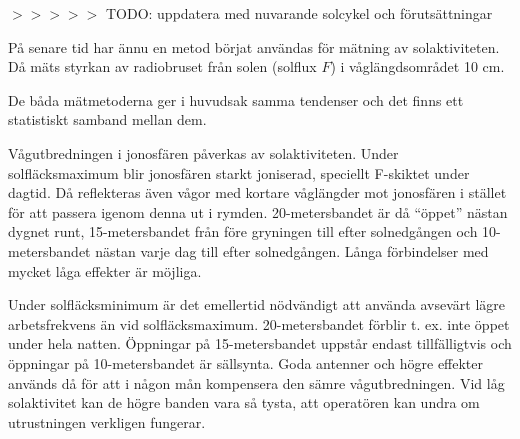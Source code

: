 $>>>>>$ TODO: uppdatera med nuvarande solcykel och förutsättningar

På senare tid har ännu en metod börjat användas för mätning av
solaktiviteten. Då mäts styrkan av radiobruset från solen (solflux
\(F\)) i våglängdsområdet 10 cm.

De båda mätmetoderna ger i huvudsak samma tendenser och det finns ett
statistiskt samband mellan dem.

Vågutbredningen i jonosfären påverkas av solaktiviteten. Under
solfläcksmaximum blir jonosfären starkt joniserad, speciellt F-skiktet
under dagtid. Då reflekteras även vågor med kortare våglängder mot
jonosfären i stället för att passera igenom denna ut i
rymden. 20-metersbandet är då ``öppet'' nästan dygnet runt,
15-metersbandet från före gryningen till efter solnedgången och
10-metersbandet nästan varje dag till efter solnedgången. Långa
förbindelser med mycket låga effekter är möjliga.

Under solfläcksminimum är det emellertid nödvändigt att använda
avsevärt lägre arbetsfrekvens än vid solfläcksmaximum.
20-metersbandet förblir t. ex. inte öppet under hela natten. Öppningar
på 15-metersbandet uppstår endast tillfälligtvis och öppningar på
10-metersbandet är sällsynta.  Goda antenner och högre effekter
används då för att i någon mån kompensera den sämre
vågutbredningen. Vid låg solaktivitet kan de högre banden vara så
tysta, att operatören kan undra om utrustningen verkligen fungerar.
